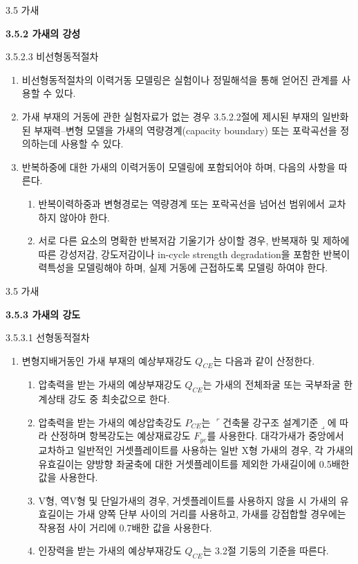 	\begin{frame}{3.5 가새}

	\textbf{3.5.2 가새의 강성}
	
	3.5.2.3 비선형동적절차
	
	\begin{enumerate}
		\item[(1)] 비선형동적절차의 이력거동 모델링은 실험이나 정밀해석을 통해 얻어진 관계를 사용할 수 있다. 
		\item[(2)] 가새 부재의 거동에 관한 실험자료가 없는 경우 3.5.2.2절에 제시된 부재의 일반화된 부재력--변형 모델을 가새의 역량경계(capacity boundary) 또는 포락곡선을 정의하는데 사용할 수 있다. 
		\item[(3)] 반복하중에 대한 가새의 이력거동이 모델링에 포함되어야 하며, 다음의 사항을 따른다. 
		\begin{enumerate}[label=\large\protect\textcircled{\small\arabic*}]
			\item 반복이력하중과 변형경로는 역량경계 또는 포락곡선을 넘어선 범위에서 교차하지 않아야 한다.  
			\item 서로 다른 요소의 명확한 반복저감 기울기가 상이할 경우, 반복재하 및 제하에 따른 강성저감, 강도저감이나 in-cycle strength degradation을 포함한 반복이력특성을 모델링해야 하며, 실제 거동에 근접하도록 모델링 하여야 한다. 
		\end{enumerate}
	\end{enumerate}
	\end{frame}
	
	



	\begin{frame}{3.5 가새}

	\textbf{3.5.3 가새의 강도}
	
	3.5.3.1 선형동적절차
	
	\begin{enumerate}
		\item[(1)] 변형지배거동인 가새 부재의 예상부재강도 $Q_{CE}$는 다음과 같이 산정한다. 
		\begin{enumerate}[label=\large\protect\textcircled{\small\arabic*}]
			\item 압축력을 받는 가새의 예상부재강도 $Q_{CE}$는 가새의 전체좌굴 또는 국부좌굴 한계상태 강도 중 최솟값으로 한다.  
			\item 압축력을 받는 가새의 예상압축강도 $P_{CE}$는 $\ulcorner$건축물 강구조 설계기준$\lrcorner$에 따라 산정하며 항복강도는 예상재료강도 $F_{ye}$를 사용한다. 대각가새가 중앙에서 교차하고 일반적인 거셋플레이트를 사용하는 일반 X형 가새의 경우, 각 가새의 유효길이는 양방향 좌굴축에 대한 거셋플레이트를 제외한 가새길이에 0.5배한 값을 사용한다.
			\item V형, 역V형 및 단일가새의 경우, 거셋플레이트를 사용하지 않을 시 가새의 유효길이는 가새 양쪽 단부 사이의 거리를 사용하고, 가새를 강접합할 경우에는 작용점 사이 거리에 0.7배한 값을 사용한다. 
			\item 인장력을 받는 가새의 예상부재강도 $Q_{CE}$는 3.2절 기둥의 기준을 따른다. 
		\end{enumerate}		
	\end{enumerate}
	\end{frame}	


